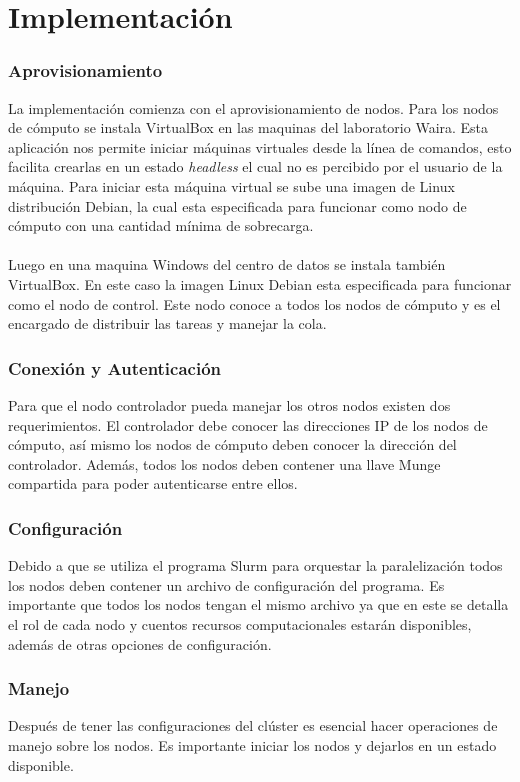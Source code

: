 \section{Implementación}
\subsubsection{Aprovisionamiento}
La implementación comienza con el aprovisionamiento de nodos. Para los nodos de cómputo se instala VirtualBox en las maquinas del laboratorio Waira. Esta aplicación nos permite iniciar máquinas virtuales desde la línea de comandos, esto facilita crearlas en un estado \textit{headless} el cual no es percibido por el usuario de la máquina. Para iniciar esta máquina virtual se sube una imagen de Linux distribución Debian, la cual esta especificada para funcionar como nodo de cómputo con una cantidad mínima de sobrecarga.
\\
\\
Luego en una maquina Windows del centro de datos se instala también VirtualBox. En este caso la imagen Linux Debian esta especificada para funcionar como el nodo de control. Este nodo conoce a todos los nodos de cómputo y es el encargado de distribuir las tareas y manejar la cola.

\subsubsection{Conexión y Autenticación}
Para que el nodo controlador pueda manejar los otros nodos existen dos requerimientos. El controlador debe conocer las direcciones IP de los nodos de cómputo, así mismo los nodos de cómputo deben conocer la dirección del controlador. Además, todos los nodos deben contener una llave Munge compartida para poder autenticarse entre ellos.

\subsubsection{Configuración}
Debido a que se utiliza el programa Slurm para orquestar la paralelización todos los nodos deben contener un archivo de configuración del programa. Es importante que todos los nodos tengan el mismo archivo ya que en este se detalla el rol de cada nodo y cuentos recursos computacionales estarán disponibles, además de otras opciones de configuración.

\subsubsection{Manejo}
Después de tener las configuraciones del clúster es esencial hacer operaciones de manejo sobre los nodos. Es importante iniciar los nodos y dejarlos en un estado disponible.

